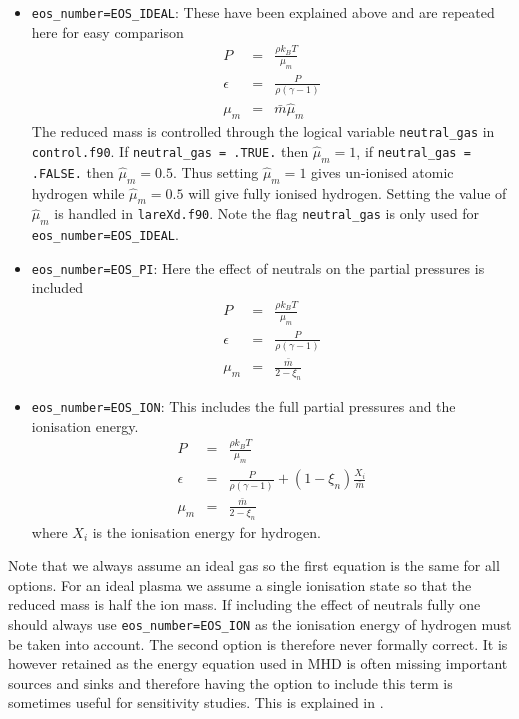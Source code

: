\documentclass[11pt]{article}
\begin{document}
\begin{itemize}
\item \texttt{eos\_number=EOS\_IDEAL}: These have been explained above and are repeated here for easy comparison
\begin{eqnarray*}
P&=&\frac{\rho k_{B}T}{\mu_m}\\
\epsilon&=&\frac{P}{\rho(\gamma-1)}\\
\mu_m&=&\bar{m}\hat{\mu}_m
\end{eqnarray*}
The reduced mass is controlled through the logical variable {\tt neutral\_gas} in  \texttt{control.f90}. If
{\tt neutral\_gas = .TRUE.} then $\hat{\mu}_m=1$, if {\tt neutral\_gas = .FALSE.} then $\hat{\mu}_m=0.5$.
Thus setting $\hat{\mu}_m=1$ gives un-ionised atomic hydrogen while $\hat{\mu}_m=0.5$ will give fully ionised hydrogen.
Setting the value of $\hat{\mu}_m$ is handled in {\tt lareXd.f90}. Note the flag {\tt neutral\_gas} is only
used for \texttt{eos\_number=EOS\_IDEAL}.

\item \texttt{eos\_number=EOS\_PI}: Here the effect of neutrals on the partial pressures is included
\begin{eqnarray*}
P&=&\frac{\rho k_{B}T}{\mu_m}\\
\epsilon&=&\frac{P}{\rho(\gamma-1)}\\
\mu_m&=&\frac{\bar{m}}{2-\xi_n}
\end{eqnarray*}

\item \texttt{eos\_number=EOS\_ION}: This includes the full partial pressures and the ionisation energy.
\begin{eqnarray*}
P&=&\frac{\rho k_{B}T}{\mu_m}\\
\epsilon&=&\frac{P}{\rho(\gamma-1)}+(1-\xi_n)\frac{X_i}{\bar{m}}\\
\mu_m&=&\frac{\bar{m}}{2-\xi_n}
\end{eqnarray*}
where $X_i$ is the ionisation energy for hydrogen.

\end{itemize}

Note that we always assume an ideal gas so the first equation is the same for all options. For an ideal plasma we 
assume a single ionisation state so that the reduced mass is half the ion mass. If including the effect of neutrals 
fully one should always use \texttt{eos\_number=EOS\_ION} as the ionisation energy of hydrogen must be taken into 
account. The second option is therefore never formally correct. It is however retained as the energy equation used 
in MHD is often missing important sources and sinks and therefore having the option to include this term is sometimes 
useful for sensitivity studies. This is explained in \cite{flux-emergence}.
\end{document}
